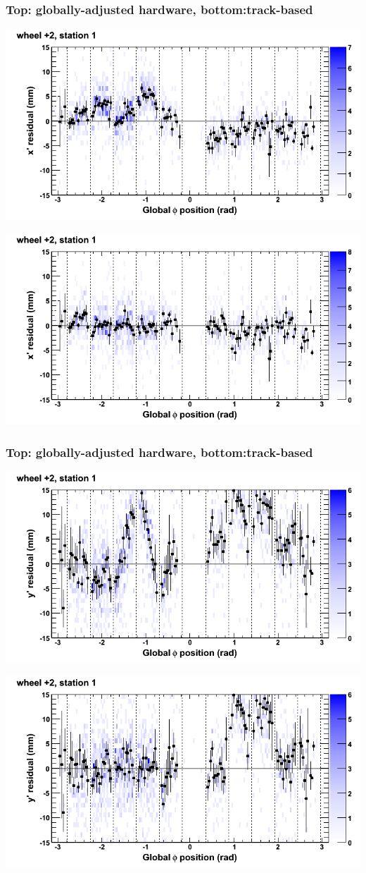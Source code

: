 \documentclass[compress]{beamer}
\begin{document}
\begin{frame}
\frametitle{Top: globally-adjusted hardware, bottom:track-based}
\includegraphics[width=0.7\linewidth]{NOV4_mapplots_HW/DTvsphi_st1whE_x.png}

\includegraphics[width=0.7\linewidth]{NOV4_mapplots/DTvsphi_st1whE_x.png}
\end{frame}

\begin{frame}
\frametitle{Top: globally-adjusted hardware, bottom:track-based}
\includegraphics[width=0.7\linewidth]{NOV4_mapplots_HW/DTvsphi_st1whE_y.png}

\includegraphics[width=0.7\linewidth]{NOV4_mapplots/DTvsphi_st1whE_y.png}
\end{frame}
\end{document}
